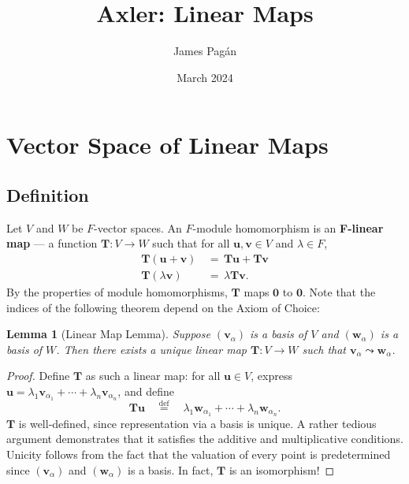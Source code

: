 \documentclass[11pt]{article}
\title{Axler: Linear Maps}
\author{James Pagán}
\date{March 2024}
\newtheorem{lemma}{Lemma}
\renewcommand{\vec}[1]{\mathbf{#1}}
\newcommand{\mat}[1]{\mathbf{#1}}
\begin{document}
\maketitle
\tableofcontents
\newpage


\section{Vector Space of Linear Maps}


\subsection{Definition}

Let $V$ and $W$ be $F$-vector spaces. An $F$-module homomorphism is an \textbf{F-linear map} --- a function $\mat{T} : V \to W$ such that for all $\vec{u}, \vec{v} \in V$ and $\lambda \in F$,
\begin{align*}
  \mat{T}(\vec{u} + \vec{v}) \, &= \, \mat{T} \vec{u} + \mat{T} \vec{v} \\
    \mat{T}(\lambda \vec{v}) \, &= \, \lambda \mat{T} \vec{v}.
\end{align*}
By the properties of module homomorphisms, $\mat{T}$ maps $\vec{0}$ to $\vec{0}$. Note that the indices of the following theorem depend on the Axiom of Choice:

\begin{adjustwidth}{0.5cm}{}
  \begin{lemma}[Linear Map Lemma]
    Suppose $(\vec{v}_{\alpha})$ is a basis of $V$ and $(\vec{w}_{\alpha})$ is a basis of $W$. Then there exists a unique linear map $\mat{T} : V \to W$ such that $\vec{v}_{\alpha} \leadsto \vec{w}_{\alpha}$.
  \end{lemma}
  \begin{proof}
    Define $\mat{T}$ as such a linear map: for all $\vec{u} \in V$, express $\vec{u} = \lambda_{1} \vec{v}_{\alpha_{1}} + \cdots + \lambda_{n} \vec{v}_{\alpha_{n}}$, and define
    \[
      \mat{T} \vec{u} \quad \stackrel{\text{def}}{=} \quad \lambda_{1} \vec{w}_{\alpha_{1}} + \cdots + \lambda_{n} \vec{w}_{\alpha_{n}}.
    \]
    $\mat{T}$ is well-defined, since representation via a basis is unique. A rather tedious argument demonstrates that it satisfies the additive and multiplicative conditions. Unicity follows from the fact that the valuation of every point is predetermined since $(\vec{v}_{\alpha})$ and $(\vec{w}_{\alpha})$ is a basis. In fact, $\mat{T}$ is an isomorphism!
  \end{proof}
\end{adjustwidth}
\end{document}
